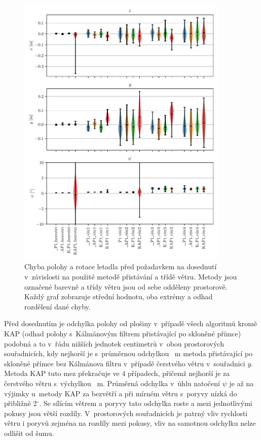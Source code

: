     \begin{figure}[H]
      \centering
      \includegraphics[width=0.9\textwidth]{img/results/presnostDotyku.pdf}
      \caption[Chyba před dosednutím]{Chyba polohy a rotace letadla před požadavkem na dosednutí v~závislosti na použité metodě přistávání a třídě větru. Metody jsou označené barevně a třídy větru jsou od sebe odděleny prostorově. Každý graf zobrazuje střední hodnotu, oba extrémy a odhad rozdělení dané chyby.}
      \label{fig:dosednutiViolin}
    \end{figure}

    Před dosednutím je odchylka polohy od plošiny v~případě všech algoritmů kromě KAP (odhad polohy s~Kálmánovým filtrem přistávající po skloněné přímce) podobná a to v~řádu nižších jednotek centimetrů v~obou prostorových souřadnicích, kdy nejhorší je s~průměrnou odchylkou \mistoPredPristaniYmeanLAPILvitrIII~m metoda přistávající po skloněné přímce bez Kálmánova filtru v~případě čerstvého větru v~souřadnici $y$. Metoda KAP tuto mez překračuje ve 4 případech, přičemž nejhorší je za čerstvého větru s~výchylkou \mistoPredPristaniYmeanKAPILvitrIII~m. Průměrná odchylka v~úhlu natočení $\psi$ je až na výjimky u~metody KAP za bezvětří a při mírném větru s~poryvy nízká do přibližně 2$^\circ$. Se sílícím větrem a poryvy tato odchylka roste a mezi jednotlivými pokusy jsou větší rozdíly. V~prostorových souřadnicích je patrný vliv rychlosti větru i poryvů zejména na rozdíly mezi pokusy, vliv na samotnou odchylku nelze odlišit od šumu.


